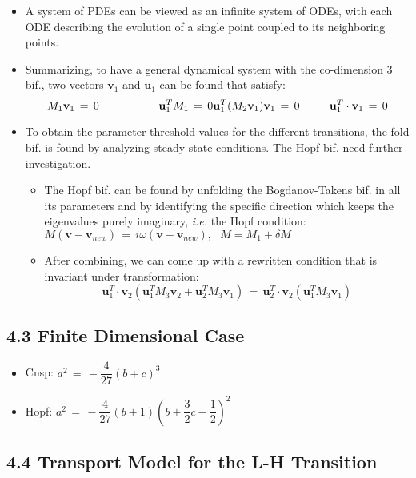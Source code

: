 \documentclass[a4paper]{article}
\begin{document}
\begin{itemize}
\item
  A system of PDEs can be viewed as an infinite system of ODEs, with
  each ODE describing the evolution of a single point coupled to its
  neighboring points.
\item
  Summarizing, to have a general dynamical system with the co-dimension
  3 bif., two vectors $\mathbf{v}_1$ and $\mathbf{u}_1$ can be found
  that satisfy:
  \[M_1 \mathbf{v}_1 \,=\, 0 ~~~~~~~~~~~~~~~~ \mathbf{u}_1^T M_1 \,=\, 0 \\ \mathbf{u}_1^T (M_2 \mathbf{v}_1) \mathbf{v}_1 \,=\, 0 ~~~~~~~~ \mathbf{u}_1^T \cdot \mathbf{v}_1 \,=\, 0\]
\item
  To obtain the parameter threshold values for the different
  transitions, the fold bif. is found by analyzing steady-state
  conditions. The Hopf bif. need further investigation.

  \begin{itemize}
  \item
    The Hopf bif. can be found by unfolding the Bogdanov-Takens bif. in
    all its parameters and by identifying the specific direction which
    keeps the eigenvalues purely imaginary, \emph{i.e.} the Hopf
    condition:
    $M(\mathbf{v} - \mathbf{v}_{new}) \,=\, i\omega(\mathbf{v} - \mathbf{v}_{new}), ~~~ M = M_1 + \delta M$
  \item
    After combining, we can come up with a rewritten condition that is
    invariant under transformation:
    \[\mathbf{u}_1^T \cdot \mathbf{v}_2 (\mathbf{u}_1^T M_3 \mathbf{v}_2 + \mathbf{u}_2^T M_3 \mathbf{v}_1) \,=\, \mathbf{u}_2^T \cdot \mathbf{v}_2 (\mathbf{u}_1^T M_3 \mathbf{v}_1)\]
  \end{itemize}
\end{itemize}

\subsection{4.3 Finite Dimensional
Case}\label{finite-dimensional-case}

\begin{itemize}
\item
  Cusp: $a^2 \,=\, -\dfrac{4}{27}(b + c)^3$
\item
  Hopf:
  $a^2 \,=\, -\dfrac{4}{27}(b + 1)\left(b + \dfrac{3}{2}c - \dfrac{1}{2}\right)^2$
\end{itemize}

\subsection{4.4 Transport Model for the L-H
Transition}\label{transport-model-for-the-l-h-transition}
\end{document}
